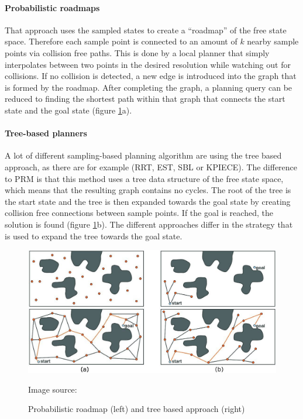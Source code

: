 \paragraph{Probabilistic roadmaps}

That approach uses the sampled states to create a ``roadmap'' of the free state space. Therefore each sample point is connected to an amount of $k$ nearby sample points via collision free paths. This is done by a local planner that simply interpolates between two points in the desired resolution while watching out for collisions. If no collision is detected, a new edge is introduced into the graph that is formed by the roadmap. After completing the graph, a planning query can be reduced to finding the shortest path within that graph that connects the start state and the goal state (figure \ref{fig:sampling_based}a).

\paragraph{Tree-based planners}

A lot of different sampling-based planning algorithm are using the tree based approach, as there are for example (RRT, EST, SBL or KPIECE). The difference to PRM is that this method uses a tree data structure of the free state space, which means that the resulting graph contains no cycles. The root of the tree is the start state and the tree is then expanded towards the goal state by creating collision free connections between sample points. If the goal is reached, the solution is found (figure \ref{fig:sampling_based}b). The different approaches differ in the strategy that is used to expand the tree towards the goal state.\\

\begin{figure}[ht]
	\centering
  	\includegraphics[width=1.0\textwidth]{images/sampling_based.jpg}
	\caption[Sampling based algorithms]{Probabilistic roadmap (left) and tree based approach (right)}
	{\scriptsize Image source: \citep{omplPrimer}}
	\label{fig:sampling_based}
\end{figure}

